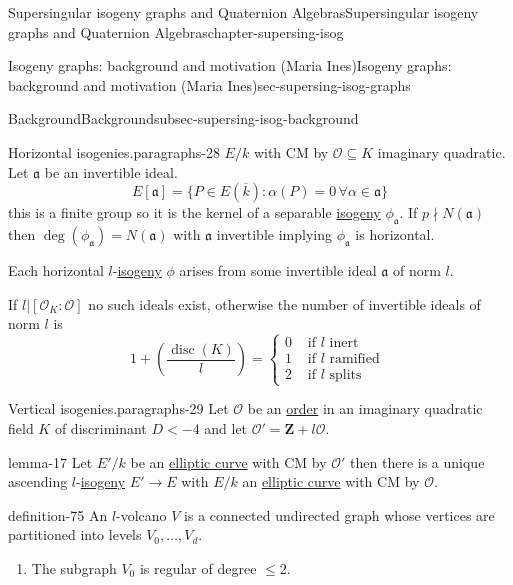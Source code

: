 \documentclass[oneside,10pt,]{book}
\numberwithin{equation}{section}
\newcommand{\ideal}[1]{\mathfrak{#1}}
\newcommand{\lb}{[}
\newcommand{\rb}{]}
\newcommand{\ZZ}{\mathbf{Z}}
\newcommand{\ints}{\mathcal{O}}
\DeclareMathOperator{\disc}{disc}
\newcommand{\lt}{<}
\newcommand{\amp}{&}
\begin{document}
\begin{chapterptx}{Supersingular isogeny graphs and Quaternion Algebras}{}{Supersingular isogeny graphs and Quaternion Algebras}{}{}{chapter-supersing-isog}
\begin{sectionptx}{Isogeny graphs: background and motivation (Maria Ines)}{}{Isogeny graphs: background and motivation (Maria Ines)}{}{}{sec-supersing-isog-graphs}
\begin{subsectionptx}{Background}{}{Background}{}{}{subsec-supersing-isog-background}
\begin{paragraphs}{Horizontal isogenies.}{paragraphs-28}%
\hypertarget{p-812}{}%
\(E/k\) with CM by \(\ints \subseteq K\) imaginary quadratic. Let \(\ideal a\) be an invertible ideal.%
\begin{equation*}
E\lb \ideal a \rb = \{ P \in E(\overline k) : \alpha (P)  = 0\, \forall \alpha \in \ideal a\}
\end{equation*}
this is a finite group so it is the kernel of a separable \hyperref[def-supersing-isog-isog]{isogeny} \(\phi_{\ideal a }\). If \(p \nmid N(\ideal a)\) then \(\deg(\phi_{\ideal a}) = N(\ideal a)\) with \(\ideal a\) invertible implying \(\phi_{\ideal a} \) is horizontal.%
\par
\hypertarget{p-813}{}%
Each horizontal \(l\)-\hyperref[def-supersing-isog-isog]{isogeny} \(\phi\) arises from some invertible ideal \(\ideal a\) of norm \(l\).%
\par
\hypertarget{p-814}{}%
If \(l | \lb \ints_K : \ints \rb \) no such ideals exist, otherwise the number of invertible ideals of norm \(l\) is%
\begin{equation*}
1+ \left(\frac {\disc(K)}{l}\right) = \begin{cases}0\amp\text{ if }l \text{ inert }\\ 1\amp\text{ if }l \text{ ramified }\\ 2\amp\text{ if }l \text{ splits}\end{cases}
\end{equation*}
%
\end{paragraphs}%
\begin{paragraphs}{Vertical isogenies.}{paragraphs-29}%
\hypertarget{p-815}{}%
Let \(\ints\) be an \hyperref[def-order-quaternion]{order} in an imaginary quadratic field \(K \) of discriminant \(D \lt -4\) and let \(\ints' = \ZZ+l\ints\).%
\begin{lemma}{}{}{lemma-17}%
\hypertarget{p-816}{}%
Let \(E' / k\)  be an \hyperref[def-supersing-isog-ec]{elliptic curve} with CM by \(\ints '\) then there is a  unique ascending \(l\)-\hyperref[def-supersing-isog-isog]{isogeny} \(E'\to E\) with \(E/k\) an \hyperref[def-supersing-isog-ec]{elliptic curve} with CM by \(\ints\).%
\end{lemma}
\begin{definition}{}{definition-75}%
\hypertarget{p-817}{}%
An \(l\)-volcano \(V\) is a connected undirected graph whose vertices are partitioned into levels \(V_0, \ldots, V_d\).\leavevmode%
\begin{enumerate}
\item\hypertarget{li-197}{}The subgraph \(V_0\) is regular of degree \(\le 2\).%

\end{enumerate}
\end{definition}
\end{paragraphs}
\end{subsectionptx}
\end{sectionptx}
\end{chapterptx}
\end{document}
